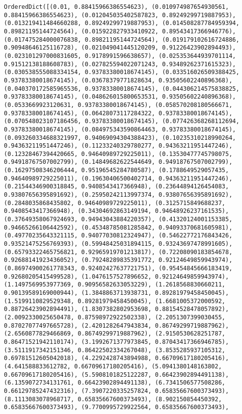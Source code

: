 \documentclass[11pt]{article}
\begin{document}
\begin{Verbatim}[commandchars=\\\{\}]
OrderedDict([(0.01, 0.88415966386554623), (0.010974987654930561, 0.88415966386554623), (0.012045035402587823, 0.89249299719887953), (0.013219411484660288, 0.89249299719887953), (0.014508287784959394, 0.89821195144724564), (0.015922827933410922, 0.89543417366946776), (0.017475284000076838, 0.89821195144724564), (0.019179102616724886, 0.90948646125116728), (0.021049041445120209, 0.91226423902894493), (0.023101297000831605, 0.9178991596638657), (0.025353644939701114, 0.91512138188608783), (0.027825594022071243, 0.93489262371615323), (0.030538555088334154, 0.93783380018674145), (0.033516026509388425, 0.93783380018674145), (0.03678379771828634, 0.93505602240896368), (0.040370172585965536, 0.93783380018674145), (0.044306214575838825, 0.93783380018674145), (0.048626015800653531, 0.93505602240896368), (0.0533669923120631, 0.93783380018674145), (0.058570208180566671, 0.93783380018674145), (0.06428073117284322, 0.93783380018674145), (0.070548023107186456, 0.93783380018674145), (0.077426368268112694, 0.93783380018674145), (0.084975343590864463, 0.93783380018674145), (0.093260334688321997, 0.94069094304388423), (0.10235310218990264, 0.94363211951447246), (0.11233240329780277, 0.94363211951447246), (0.12328467394420665, 0.94640989729225011), (0.13530477745798075, 0.94918767507002799), (0.14849682622544649, 0.94918767507002799), (0.16297508346206444, 0.95196545284780587), (0.1788649529057435, 0.94640989729225011), (0.19630406500402714, 0.94363211951447246), (0.21544346900318845, 0.9408543417366948), (0.23644894126454083, 0.93807656395891692), (0.25950242113997374, 0.93807656395891692), (0.2848035868435802, 0.94640989729225011), (0.3125715849688237, 0.9408543417366948), (0.34304692863149194, 0.94648926237161535), (0.37649358067924693, 0.94943043884220357), (0.41320124001153385, 0.94665266106442592), (0.45348785081285842, 0.94093370681605981), (0.49770235643321115, 0.94077030812324947), (0.54622772176843426, 0.93521475256769393), (0.59948425031894115, 0.93243697478991605), (0.65793322465756821, 0.92965919701213817), (0.72208090183854678, 0.92688141923436052), (0.79248289835391772, 0.92124649859943974), (0.86974900261778343, 0.92402427637721751), (0.95454845666183419, 0.92680205415499528), (1.0476157527896652, 0.92124649859943974), (1.1497569953977369, 0.90956582633053229), (1.2618568830660211, 0.90139589169000944), (1.3848863713938731, 0.89281979458450045), (1.5199110829529348, 0.89281979458450045), (1.6681005372000592, 0.88726423902894491), (1.8307382802953698, 0.88154528478057892), (2.0092330025650478, 0.87598972922502338), (2.2051307399030455, 0.87027077497665728), (2.4201282647943834, 0.86749299719887962), (2.6560877829466869, 0.86749299719887962), (2.9150530628251787, 0.86471521942110174), (3.1992671377973845, 0.87043417366946785), (3.5111917342151346, 0.86422502334267048), (3.8535285937105312, 0.69781512605042018), (4.2292428743894988, 0.66709617180205416), (4.641588833612782, 0.66709617180205416), (5.0941380148163802, 0.66709617180205416), (5.5908101825122287, 0.66423902894491138), (6.1359072734131761, 0.66423902894491138), (6.7341506577508286, 0.66129785247432316), (7.3907220335257824, 0.65835667600373493), (8.1113083078968717, 0.65835667600373493), (8.902150854450392, 0.65835667600373493), (9.7700995729922564, 0.65835667600373493), 
\end{Verbatim}
\end{document}
